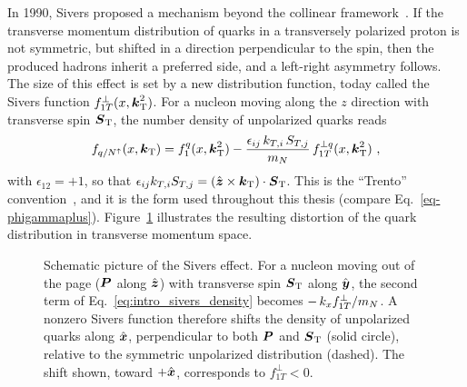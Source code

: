 In 1990, Sivers proposed a mechanism beyond the collinear framework~\cite{Sivers:1989cc}. If the transverse momentum distribution of quarks in a transversely polarized proton is not symmetric, but shifted in a direction perpendicular to the spin, then the produced hadrons inherit a preferred side, and a left-right asymmetry follows. The size of this effect is set by a new distribution function, today called the Sivers function $f_{1T}^\perp(x,\boldsymbol{k}_{\mathrm T}^2)$. For a nucleon moving along the $z$ direction with transverse spin $\boldsymbol{S}_{\mathrm T}$, the number density of unpolarized quarks reads
\begin{equation}
  f_{q/N^\uparrow}(x,\boldsymbol{k}_{\mathrm T}) = f_1^q(x,\boldsymbol{k}_{\mathrm T}^2) - \frac{\epsilon_{ij}\,k_{T,i}\,S_{T,j}}{m_N}\, f_{1T}^{\perp q}(x,\boldsymbol{k}_{\mathrm T}^2) \ ,
  \label{eq:intro_sivers_density}
\end{equation}
with $\epsilon_{12}=+1$, so that $\epsilon_{ij}k_{T,i}S_{T,j} = (\hat{\boldsymbol{z}}\times\boldsymbol{k}_{\mathrm T})\cdot\boldsymbol{S}_{\mathrm T}$. This is the ``Trento'' convention~\cite{Bacchetta:2004jz}, and it is the form used throughout this thesis (compare Eq.~\eqref{eq-phigammaplus}). Figure~\ref{fig:intro_sivers_cartoon} illustrates the resulting distortion of the quark distribution in transverse momentum space.

\begin{figure}[htpb]
\centering
{}
\caption{Schematic picture of the Sivers effect. For a nucleon moving out of the page ($\boldsymbol{P}$ along $\hat{\boldsymbol{z}}$) with transverse spin $\boldsymbol{S}_{\mathrm T}$ along $\hat{\boldsymbol{y}}$, the second term of Eq.~\eqref{eq:intro_sivers_density} becomes $-\,k_x f_{1T}^\perp/m_N$. A nonzero Sivers function therefore shifts the density of unpolarized quarks along $\hat{\boldsymbol{x}}$, perpendicular to both $\boldsymbol{P}$ and $\boldsymbol{S}_{\mathrm T}$ (solid circle), relative to the symmetric unpolarized distribution (dashed). The shift shown, toward $+\hat{\boldsymbol{x}}$, corresponds to $f_{1T}^\perp<0$.}
\label{fig:intro_sivers_cartoon}
\end{figure}

